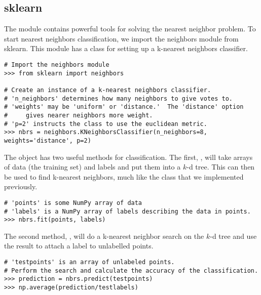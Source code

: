 \subsection*{sklearn}

The  module contains powerful tools for solving the nearest neighbor problem.
To start nearest neighbors classification, we import the neighbors module from sklearn.
This module has a class for setting up a k-nearest neighbors classifier.
\begin{lstlisting}
# Import the neighbors module
>>> from sklearn import neighbors

# Create an instance of a k-nearest neighbors classifier.
# 'n_neighbors' determines how many neighbors to give votes to.
# 'weights' may be 'uniform' or 'distance.'  The 'distance' option
#     gives nearer neighbors more weight.
# 'p=2' instructs the class to use the euclidean metric.
>>> nbrs = neighbors.KNeighborsClassifier(n_neighbors=8, weights='distance', p=2)
\end{lstlisting}

The  object has two useful methods for classification.
The first, , will take arrays of data (the training set) and labels and put them into a $k$-d tree.
This can then be used to find k-nearest neighbors, much like the  class that we implemented previously.

\begin{lstlisting}
# 'points' is some NumPy array of data
# 'labels' is a NumPy array of labels describing the data in points.
>>> nbrs.fit(points, labels)
\end{lstlisting}

The second method, , will do a k-nearest neighbor search on the $k$-d tree and use the result to attach a label to unlabelled points.

\begin{lstlisting}
# 'testpoints' is an array of unlabeled points.
# Perform the search and calculate the accuracy of the classification.
>>> prediction = nbrs.predict(testpoints)
>>> np.average(prediction/testlabels)
\end{lstlisting}

